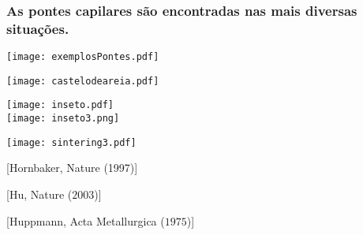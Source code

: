 \documentclass[8pt]{beamer}
\begin{document}
\begin{frame}
\frametitle{As pontes capilares são encontradas nas mais diversas situações.}

	\begin{center}
		\texttt{[image: exemplosPontes.pdf]}
	\end{center}

	\begin{minipage}{0.32\textwidth}
		\begin{center}
			\texttt{[image: castelodeareia.pdf]}
		\end{center}
	\end{minipage}
	\begin{minipage}{0.32\textwidth}
		\begin{center}
			\texttt{[image: inseto.pdf]}\\
			\texttt{[image: inseto3.png]}
		\end{center}
	\end{minipage}
	\begin{minipage}{0.32\textwidth}
		\begin{center}
			\texttt{[image: sintering3.pdf]}
		\end{center}
	\end{minipage}	
	
	\begin{minipage}{0.32\textwidth}
		\begin{center}
			{\tiny [Hornbaker, Nature (1997)]}
		\end{center}	
	\end{minipage}
	\begin{minipage}{0.32\textwidth}
		\begin{center}
			{\tiny [Hu, Nature ($2003$)]}
		\end{center}	
	\end{minipage}
	\begin{minipage}{0.32\textwidth}
		\begin{center}
			\tiny{[Huppmann, Acta Metallurgica ($1975$)]}
		\end{center}
	\end{minipage}



\end{frame}
\end{document}
